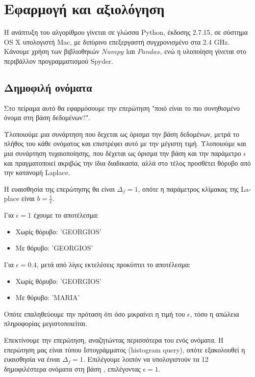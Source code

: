 \clearpage
\section{Εφαρμογή και αξιολόγηση}

Η ανάπτυξη του αλγορίθμου γίνεται σε γλώσσα \textlatin{Python}, έκδοσης 2.7.15, σε σύστημα \textlatin{OS X} υπολογιστή \textlatin{Mac}, με διπύρινο επεξεργαστή συγχρονισμένο στα 2.4 \textlatin{GHz}. Κάνουμε χρήση των βιβλιοθηκών $Numpy$  kαι $Pandas$, ενώ η υλοποίηση γίνεται στο περιβάλλον προγραμματισμού  \textlatin{Spyder}.
 

\subsection{Δημοφιλή ονόματα}

Στο πείραμα αυτό θα εφαρμόσουμε την επερώτηση "ποιό είναι το πιο συνηθισμένο όνομα στη βάση δεδομένων?".

Υλοποιούμε μια συνάρτηση που δεχεται ως όρισμα την βάση δεδομένων, μετρά το πλήθος του κάθε ονόματος και επιστρέφει αυτό με την μέγιστη τιμή. Υλοποιούμε και μια συνάρτηση τυχαιοποίησης, που δέχεται ως όρισμα την βάση και την παράμετρο $\epsilon$ και πραγματοποιεί ακριβώς την ίδια διαδικασία, αλλά στο τέλος προσθέτει θόρυβο από την κατανομή \textlatin{Laplace}.

Η ευαισθησία της επερώτησης θα είναι $\Delta_f=1$, οπότε η παράμετρος κλίμακας της \textlatin{Laplace} είναι $b=\frac{1}{\epsilon}$.

Για $\epsilon=1$ έχουμε το αποτέλεσμα:
\begin{itemize}
    \item Χωρίς θόρυβο: '\textlatin{GEORGIOS}'
     \item Με θόρυβο: '\textlatin{GEORGIOS}'
\end{itemize}



Για $\epsilon=0.4$, μετά από λίγες εκτελέσεις προκύπτει το αποτέλεσμα:
\begin{itemize}
    \item Χωρίς θόρυβο: '\textlatin{GEORGIOS}'
     \item Με θόρυβο: '\textlatin{MARIA}'
\end{itemize}

Οπότε επαληθεύουμε την πρόταση ότι όσο μικραίνει η τιμή του $\epsilon$, τόσο η απώλεια πληροφορίας μεγιστοποιείται. 

Επεκτίνουμε την επερώτηση, αναζητώντας περισσότερα του ενός ονόματα. Η επερώτηση μας είναι τύπου Ιστογράμματος (\textlatin{histogram query}), οπότε εξακολουθεί η ευαισθησία να έιναι $\Delta_f=1$. Επιλέγουμε λοιπόν να υπολογιστούν τα 12 δημοφιλέστερα ονόματα στη βάση , επιλέγοντας $\epsilon=1$.

